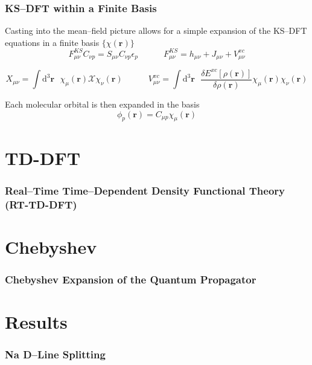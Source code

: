 \documentclass{beamer}
\begin{document}
\begin{frame}
\frametitle{KS--DFT within a Finite Basis}

Casting into the mean--field picture allows for a simple expansion
of the KS--DFT equations in a finite basis $\{\chi(\mathbf{r})\}$
\begin{equation*}
F_{\mu\nu}^{KS} C_{\nu p} = S_{\mu\nu}C_{\nu p} \epsilon_p \qquad \quad
F_{\mu\nu}^{KS} = h_{\mu\nu} + J_{\mu\nu} + V^{xc}_{\mu\nu}
\end{equation*}

\begin{equation*}
X_{\mu\nu} = \int \mathrm{d}^3\mathbf{r}\text{ } \chi_\mu(\mathbf{r}) \mathcal{X} \chi_\nu(\mathbf{r})
\qquad \quad V^{xc}_{\mu\nu} = \int \mathrm{d}^3\mathbf{r}\text{ } 
  \frac{\delta E^{xc}[\rho(\mathbf{r})]}{\delta \rho(\mathbf{r})}
  \chi_\mu(\mathbf{r}) \chi_\nu(\mathbf{r})
\end{equation*}

Each molecular orbital is then expanded in the basis
\begin{equation*}
\phi_p(\mathbf{r}) = C_{\mu p} \chi_\mu(\mathbf{r})
\end{equation*}
\end{frame}

\section{TD-DFT}

\begin{frame}
\frametitle{Real--Time Time--Dependent Density Functional Theory (RT-TD-DFT)}
\end{frame}

\section{Chebyshev}

\begin{frame}
\frametitle{Chebyshev Expansion of the Quantum Propagator}
\end{frame}

\section{Results}

\begin{frame}
\frametitle{Na D--Line Splitting}
\end{frame}
\end{document}
